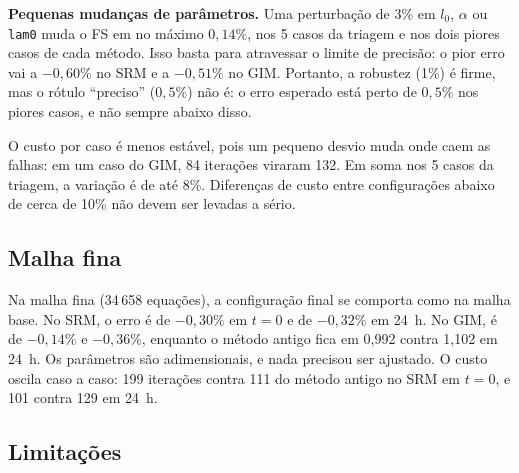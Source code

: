 \documentclass[11pt,a4paper]{article}
\numberwithin{equation}{section}
\begin{document}
\textbf{Pequenas mudanças de parâmetros.} Uma perturbação de 3\% em $l_0$, $\alpha$ ou \texttt{lam0} muda o FS em no máximo $0{,}14\%$, nos 5 casos da triagem e nos dois piores casos de cada método. Isso basta para atravessar o limite de precisão: o pior erro vai a $-0{,}60\%$ no SRM e a $-0{,}51\%$ no GIM. Portanto, a robustez (1\%) é firme, mas o rótulo ``preciso'' ($0{,}5\%$) não é: o erro esperado está perto de $0{,}5\%$ nos piores casos, e não sempre abaixo disso.

O custo por caso é menos estável, pois um pequeno desvio muda onde caem as falhas: em um caso do GIM, 84 iterações viraram 132. Em soma nos 5 casos da triagem, a variação é de até 8\%. Diferenças de custo entre configurações abaixo de cerca de 10\% não devem ser levadas a sério.

\subsection{Malha fina}\label{sec:fina}

Na malha fina (34\,658 equações), a configuração final se comporta como na malha base. No SRM, o erro é de $-0{,}30\%$ em $t = 0$ e de $-0{,}32\%$ em 24~h. No GIM, é de $-0{,}14\%$ e $-0{,}36\%$, enquanto o método antigo fica em 0,992 contra 1,102 em 24~h. Os parâmetros são adimensionais, e nada precisou ser ajustado. O custo oscila caso a caso: 199 iterações contra 111 do método antigo no SRM em $t = 0$, e 101 contra 129 em 24~h.

\subsection{Limitações}\label{sec:limitacoes}
\end{document}
